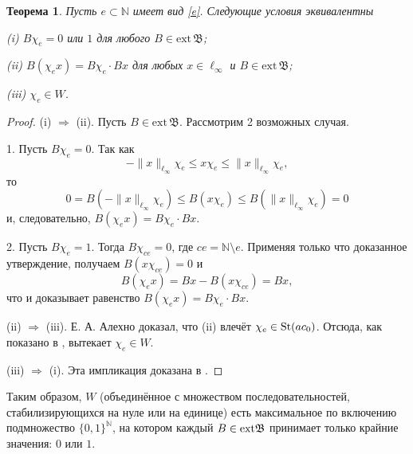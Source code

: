\documentclass[12pt]{article}
\newtheorem{thm}{Теорема}
\def\N{{\mathbb{N}}}
\def\B{{\mathfrak{B}}}
\def\ext{{\mathrm{ext}\,}}
\begin{document}


\begin{thm}\label{thm1}
Пусть $e\subset \N$ имеет вид \eqref{e}. Следующие условия эквивалентны

(i) $B\chi_e=0$ или $1$ для любого $B\in \ext\B$;

(ii) $B(\chi_e x)= B\chi_e \cdot Bx$ для любых $x\in \ell_\infty$ и $B\in \ext\B$;

(iii) $\chi_e\in W$.
\end{thm}

\begin{proof}
(i) $\Longrightarrow$ (ii). Пусть $B\in \ext\B$. Рассмотрим 2 возможных случая.

1. Пусть $B\chi_e=0$. Так как
$$-\|x\|_{\ell_\infty}\chi_e \leqslant x \chi_e \leqslant \|x\|_{\ell_\infty}\chi_e,$$
то
$$0=B(-\|x\|_{\ell_\infty}\chi_e) \leqslant B(x \chi_e) \leqslant B(\|x\|_{\ell_\infty}\chi_e)=0$$
и, следовательно, $B(\chi_e x)= B\chi_e \cdot Bx$.

2. Пусть $B\chi_e=1$. Тогда $B\chi_{ce}=0$, где $ce=\N\setminus e$. Применяя только что доказанное утверждение, получаем $B(x\chi_{ce})=0$ и
$$B(\chi_e x)= Bx - B(x\chi_{ce})= Bx,$$
что и доказывает равенство $B(\chi_e x)= B\chi_e \cdot Bx$.


(ii) $\Longrightarrow$ (iii). Е. А. Алехно \cite[Утверждение 2.3]{Alekhno} доказал, что (ii) влечёт $\chi_e \in {\rm St}(ac_0)$. Отсюда, как показано в  \cite[Лемма 35]{SSU2}, вытекает $\chi_e\in W$.

(iii) $\Longrightarrow$ (i). Эта импликация доказана в \cite[Следствие 29]{SSU2}.
\end{proof}

Таким образом, $W$ (объединённое с множеством последовательностей, стабилизирующихся на нуле или на единице) есть максимальное по включению подмножество $\{0,1\}^\N$, на котором каждый $B\in {\rm ext}\mathfrak B$ принимает только крайние значения: $0$ или $1$.
\end{document}
